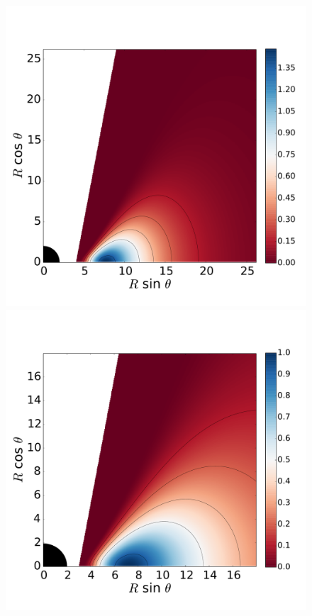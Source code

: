 \documentclass[twocolumn,aps,showpacs,showkeys,prd,superscriptaddress,byrevtex, amsmath]{revtex4-1}
\begin{document}
\begin{figure}
\hspace{-0.2cm}
\includegraphics[scale=0.14]{figures/fig10_0__10.pdf}
\\
\includegraphics[scale=0.14]{figures/fig10_05_10.pdf}

\end{figure}
\end{document}
